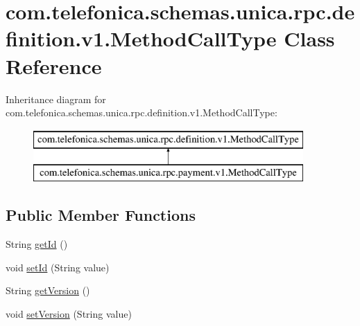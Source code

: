 \hypertarget{classcom_1_1telefonica_1_1schemas_1_1unica_1_1rpc_1_1definition_1_1v1_1_1MethodCallType}{
\section{com.telefonica.schemas.unica.rpc.definition.v1.MethodCallType Class Reference}
\label{classcom_1_1telefonica_1_1schemas_1_1unica_1_1rpc_1_1definition_1_1v1_1_1MethodCallType}
}
Inheritance diagram for com.telefonica.schemas.unica.rpc.definition.v1.MethodCallType:\begin{figure}[H]
\begin{center}
\leavevmode
\includegraphics[height=2.000000cm]{classcom_1_1telefonica_1_1schemas_1_1unica_1_1rpc_1_1definition_1_1v1_1_1MethodCallType}
\end{center}
\end{figure}
\subsection*{Public Member Functions}
\begin{DoxyCompactItemize}
\item 
String \hyperlink{classcom_1_1telefonica_1_1schemas_1_1unica_1_1rpc_1_1definition_1_1v1_1_1MethodCallType_a90b56ebd4398358b4239954b7152ca41}{getId} ()
\item 
void \hyperlink{classcom_1_1telefonica_1_1schemas_1_1unica_1_1rpc_1_1definition_1_1v1_1_1MethodCallType_a03168e2bfb21ab1bd6168dd9de4d961c}{setId} (String value)
\item 
String \hyperlink{classcom_1_1telefonica_1_1schemas_1_1unica_1_1rpc_1_1definition_1_1v1_1_1MethodCallType_a89ada399dbf83ef01045fb37b2d9551e}{getVersion} ()
\item 
void \hyperlink{classcom_1_1telefonica_1_1schemas_1_1unica_1_1rpc_1_1definition_1_1v1_1_1MethodCallType_ab7ad6864eb8cf3698555019f765e4e54}{setVersion} (String value)
\end{DoxyCompactItemize}
